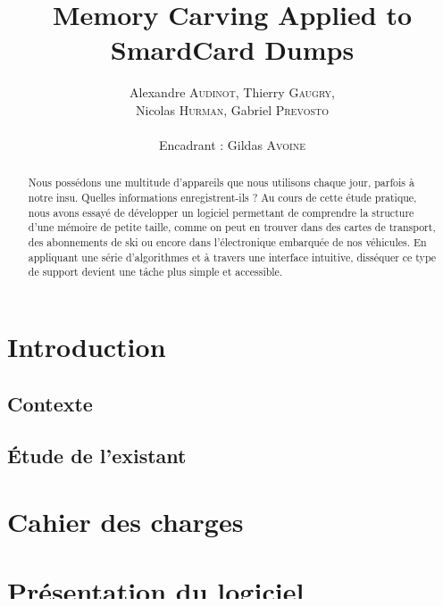 \documentclass[a4paper,11pt]{article}
\title{ \textbf{Memory Carving Applied to SmardCard Dumps} }
\author{Alexandre \textsc{Audinot}, Thierry \textsc{Gaugry}, \\
        Nicolas \textsc{Hurman}, Gabriel \textsc{Prevosto} \\
        \\
        Encadrant : Gildas \textsc{Avoine}}
\date{}                    %
\begin{document}
\maketitle                 %
\thispagestyle{empty}      %



\begin{abstract}
Nous possédons une multitude d'appareils que nous utilisons chaque jour, parfois à notre insu. Quelles informations enregistrent-ils ?
Au cours de cette étude pratique, nous avons essayé de développer un logiciel permettant de comprendre la structure d'une mémoire de petite taille, comme on peut en trouver dans des cartes de transport, des abonnements de ski ou encore dans l'électronique embarquée de nos véhicules. En appliquant une série d'algorithmes et à travers une interface intuitive, disséquer ce type de support devient une tâche plus simple et accessible.
\end{abstract}

\section{Introduction}
  \subsection{Contexte} 
  \subsection{\'Etude de l'existant} 
\section{Cahier des charges}
  
\section{Présentation du logiciel}
  \subsection{Technologies utilisées} 
  \subsection{Interface} 
  \subsection{Fonctionnalités} 
\end{document}
